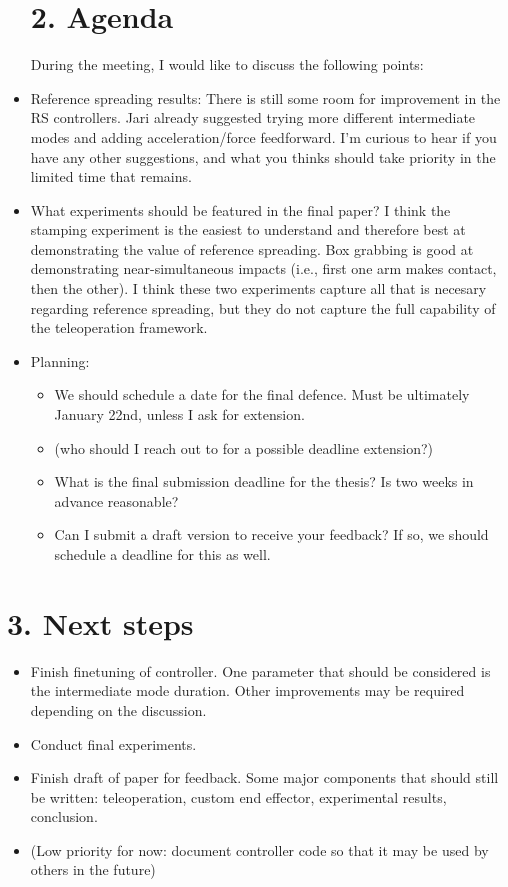 \documentclass[11pt]{report}
\numberwithin{equation}{section}        %
\numberwithin{figure}{section}          %
\numberwithin{table}{section}           %
\begin{document}
\begin{itemize}
  \section*{2. Agenda}
  During the meeting, I would like to discuss the following points:
  \item Reference spreading results: There is still some room for improvement in the RS controllers. Jari already suggested trying more different intermediate modes and adding acceleration/force feedforward. I'm curious to hear if you have any other suggestions, and what you thinks should take priority in the limited time that remains. 
  \item What experiments should be featured in the final paper? I think the stamping experiment is the easiest to understand and therefore best at demonstrating the value of reference spreading. Box grabbing is good at demonstrating near-simultaneous impacts (i.e., first one arm makes contact, then the other). I think these two experiments capture all that is necesary regarding reference spreading, but they do not capture the full capability of the teleoperation framework.
      \item Planning: 
      \begin{itemize}
        \item We should schedule a date for the final defence. Must be ultimately January 22nd, unless I ask for extension. 
        \item (who should I reach out to for a possible deadline extension?)
        \item What is the final submission deadline for the thesis? Is two weeks in advance reasonable?
        \item Can I submit a draft version to receive your feedback? If so, we should schedule a deadline for this as well.
      \end{itemize}
  \end{itemize}

  \section*{3. Next steps}

  \begin{itemize}
      \item Finish finetuning of controller. One parameter that should be considered is the intermediate mode duration. Other improvements may be required depending on the discussion.
      \item Conduct final experiments. 
      \item Finish draft of paper for feedback. Some major components that should still be written: teleoperation, custom end effector, experimental results, conclusion.
      \item (Low priority for now: document controller code so that it may be used by others in the future)
  \end{itemize}
\end{document}
